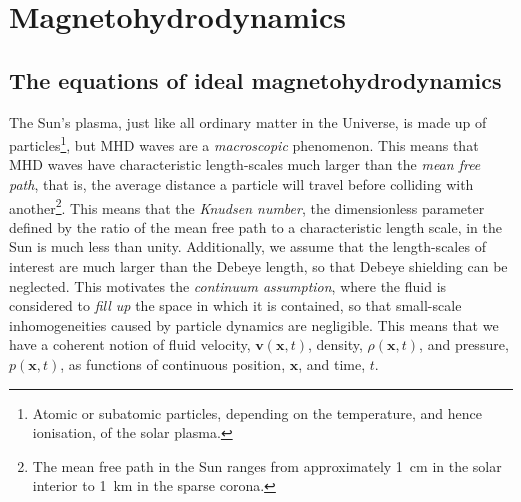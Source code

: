 \section{Magnetohydrodynamics}
\label{sec: MHD}


\subsection{The equations of ideal magnetohydrodynamics} \label{sec: MHD eqns}

The Sun's plasma, just like all ordinary  matter in the Universe, is made up of particles\footnote{Atomic or subatomic particles, depending on the temperature, and hence ionisation, of the solar plasma.}, but MHD waves are a \textit{macroscopic} phenomenon. This means that MHD waves have characteristic length-scales much larger than the \textit{mean free path}, that is, the average distance a particle will travel before colliding with another\footnote{The mean free path in the Sun ranges from approximately 1~cm in the solar interior to 1~km in the sparse corona.}. This means that the \textit{Knudsen number}, the dimensionless parameter defined by the ratio of the mean free path to a characteristic length scale, in the Sun is much less than unity. Additionally, we assume that the length-scales of interest are much larger than the Debeye length, so that Debeye shielding can be neglected. This motivates the \textit{continuum assumption}, where the fluid is considered to \textit{fill up} the space in which it is contained, so that small-scale inhomogeneities caused by particle dynamics are negligible. This means that we have a coherent notion of fluid velocity, $\mathbf{v}(\mathbf{x}, t)$, density, $\rho(\mathbf{x}, t)$, and pressure, $p(\mathbf{x}, t)$, as functions of continuous position, $\mathbf{x}$, and time, $t$.

